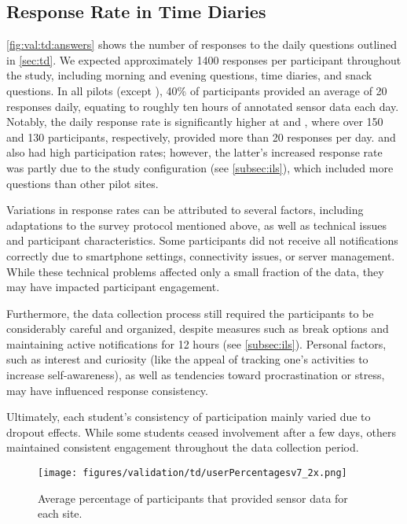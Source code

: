 \subsection{Response Rate in Time Diaries} \label{subsec:dailyresponses}

\cref{fig:val:td:answers} shows the number of responses to the daily questions outlined in \cref{sec:td}. We expected approximately 1400 responses per participant throughout the study, including morning and evening questions, time diaries, and snack questions. In all pilots (except \AMRITA), 40\% of participants provided an average of 20 responses daily, equating to roughly ten hours of annotated sensor data each day. Notably, the daily response rate is significantly higher at \UNITN and \NUM, where over 150 and 130 participants, respectively, provided more than 20 responses per day. \JLU and \IPICYT also had high participation rates; however, the latter's increased response rate was partly due to the study configuration (see \cref{subsec:ils}), which included more questions than other pilot sites.

Variations in response rates can be attributed to several factors, including adaptations to the survey protocol mentioned above, as well as technical issues and participant characteristics. Some participants did not receive all notifications correctly due to smartphone settings, connectivity issues, or server management. While these technical problems affected only a small fraction of the data, they may have impacted participant engagement.

Furthermore, the data collection process still required the participants to be considerably careful and organized, despite measures such as break options and maintaining active notifications for 12 hours (see \cref{subsec:ils}). Personal factors, such as interest and curiosity (like the appeal of tracking one’s activities to increase self-awareness), as well as tendencies toward procrastination or stress, may have influenced response consistency.

Ultimately, each student’s consistency of participation mainly varied due to dropout effects. While some students ceased involvement after a few days, others maintained consistent engagement throughout the data collection period.

\begin{figure}[hbt]
    \texttt{[image: figures/validation/td/userPercentagesv7\_2x.png]}
    \caption{Average percentage of participants that provided sensor data for each site.}
    \label{fig:sensors:participantstats}
\end{figure}

